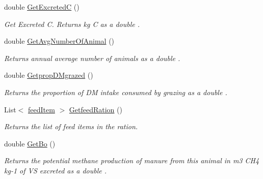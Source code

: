 \begin{DoxyCompactItemize}
\mbox{\label{classlivestock_a1eda214a709c3097f8d471cc965d44fd}} 
double \mbox{\hyperlink{classlivestock_a1eda214a709c3097f8d471cc965d44fd}{Get\+ExcretedC}} ()
\begin{DoxyCompactList}\small\item\em Get Excreted C. Returns kg C as a double . \end{DoxyCompactList}\item 
\mbox{\label{classlivestock_a00c96a37b8bbcceae2bbc6ecad03103a}} 
double \mbox{\hyperlink{classlivestock_a00c96a37b8bbcceae2bbc6ecad03103a}{Get\+Avg\+Number\+Of\+Animal}} ()
\begin{DoxyCompactList}\small\item\em Returns annual average number of animals as a double . \end{DoxyCompactList}\item 
\mbox{\label{classlivestock_a3199154ed8a6b458c8d355c4697422bd}} 
double \mbox{\hyperlink{classlivestock_a3199154ed8a6b458c8d355c4697422bd}{Getprop\+D\+Mgrazed}} ()
\begin{DoxyCompactList}\small\item\em Returns the proportion of DM intake consumed by grazing as a double . \end{DoxyCompactList}\item 
\mbox{\label{classlivestock_ad34f357b0d2c43c8b919013227f50d8e}} 
List$<$ \mbox{\hyperlink{classfeed_item}{feed\+Item}} $>$ \mbox{\hyperlink{classlivestock_ad34f357b0d2c43c8b919013227f50d8e}{Getfeed\+Ration}} ()
\begin{DoxyCompactList}\small\item\em Returns the list of feed items in the ration. \end{DoxyCompactList}\item 
\mbox{\label{classlivestock_a9744aa8fa110c1b3625f100e3621f8d0}} 
double \mbox{\hyperlink{classlivestock_a9744aa8fa110c1b3625f100e3621f8d0}{Get\+Bo}} ()
\begin{DoxyCompactList}\small\item\em Returns the potential methane production of manure from this animal in m3 C\+H4 kg-\/1 of VS excreted as a double . \end{DoxyCompactList}\item 

\end{DoxyCompactItemize}
